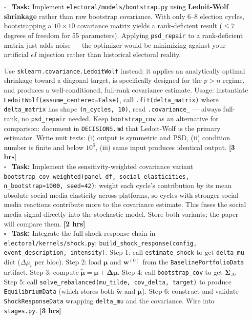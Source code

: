 \documentclass[11pt]{article}
\newcommand{\hrs}[1]{\textbf{[#1 hrs]}}
\newcommand{\boldmu}{\boldsymbol{\mu}}
\newcommand{\boldSigma}{\boldsymbol{\Sigma}}
\newcommand{\task}[2]{%
  \noindent\textbf{Task:} #1 \hfill \hrs{#2}\\}
\newcommand{\done}{\textcolor{sectionblue}{$\square$}\ }
\begin{document}
\begin{taskbox}
\done \task{Implement \texttt{electoral/models/bootstrap.py} using
  \textbf{Ledoit-Wolf shrinkage} rather than raw bootstrap covariance.
  With only 6--8 election cycles, bootstrapping a $10 \times 10$ covariance
  matrix yields a rank-deficient result ($\leq 7$ degrees of freedom for
  55 parameters). Applying \texttt{psd\_repair} to a rank-deficient matrix
  just adds noise --- the optimizer would be minimizing against your
  artificial $\epsilon I$ injection rather than historical electoral reality.

  Use \texttt{sklearn.covariance.LedoitWolf} instead: it applies an
  analytically optimal shrinkage toward a diagonal target, is specifically
  designed for the $p > n$ regime, and produces a well-conditioned,
  full-rank covariance estimate. Usage: instantiate
  \texttt{LedoitWolf(assume\_centered=False)}, call \texttt{.fit(delta\_matrix)}
  where \texttt{delta\_matrix} has shape \texttt{(n\_cycles, 10)}, read
  \texttt{.covariance\_} --- always full-rank, no \texttt{psd\_repair} needed.
  Keep \texttt{bootstrap\_cov} as an alternative for comparison; document
  in \texttt{DECISIONS.md} that Ledoit-Wolf is the primary estimator.
  Write unit tests: (i) output is symmetric and PSD, (ii) condition number
  is finite and below $10^6$, (iii) same input produces identical output.}{3}

\done \task{Implement the sensitivity-weighted covariance variant
  \texttt{bootstrap\_cov\_weighted(panel\_df, social\_elasticities,
  n\_bootstrap=1000, seed=42)}: weight each cycle's contribution by its
  mean absolute social media elasticity across platforms, so cycles with
  stronger social media reactions contribute more to the covariance estimate.
  This fuses the social media signal directly into the stochastic model.
  Store both variants; the paper will compare them.}{2}

\done \task{Integrate the full shock response chain in
  \texttt{electoral/kernels/shock.py}: \texttt{build\_shock\_response(config,
  event\_description, intensity)}. Step 1: call \texttt{estimate\_shock}
  to get \texttt{delta\_mu} dict ($\Delta\mu_i$ per bloc). Step 2: load
  $\boldmu$ and $\mathbf{w}^{(0)}$ from the \texttt{BaselinePortfolioData}
  artifact. Step 3: compute $\tilde{\boldmu} = \boldmu + \boldsymbol{\Delta\mu}$.
  Step 4: call \texttt{bootstrap\_cov} to get $\boldSigma_\Delta$.
  Step 5: call \texttt{solve\_rebalanced(mu\_tilde, cov\_delta, target)}
  to produce \texttt{EquilibriumData} (which stores both $\tilde{\mathbf{w}}$
  and $\tilde{\boldmu}$). Step 6: construct and validate
  \texttt{ShockResponseData} wrapping \texttt{delta\_mu} and the covariance.
  Wire into \texttt{stages.py}.}{3}
\end{taskbox}
\end{document}

